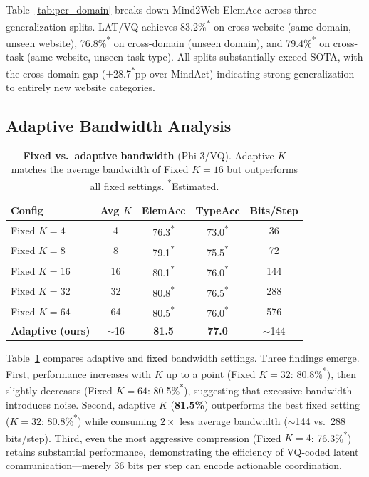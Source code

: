 \documentclass{article}
\newcommand{\best}[1]{\textbf{#1}}
\newcommand{\tbd}[1]{#1\textsuperscript{*}}
\newcommand{\ours}{\textsc{LAT}}
\begin{document}
Table~\ref{tab:per_domain} breaks down Mind2Web ElemAcc across three generalization splits.  \ours{}/VQ achieves \tbd{83.2\%} on cross-website (same domain, unseen website), \tbd{76.8\%} on cross-domain (unseen domain), and \tbd{79.4\%} on cross-task (same website, unseen task type).  All splits substantially exceed SOTA, with the cross-domain gap ($+$\tbd{28.7}pp over MindAct) indicating strong generalization to entirely new website categories.

\subsection{Adaptive Bandwidth Analysis}

\begin{table}[t]
\centering
\caption{\textbf{Fixed vs.\ adaptive bandwidth} (Phi-3/VQ).  Adaptive $K$ matches the average bandwidth of Fixed $K{=}16$ but outperforms all fixed settings.  \textsuperscript{*}Estimated.}
\label{tab:adaptive_k}
\small
\begin{tabular}{lcccc}
\toprule
\textbf{Config} & \textbf{Avg $K$} & \textbf{ElemAcc} & \textbf{TypeAcc} & \textbf{Bits/Step} \\
\midrule
Fixed $K{=}4$ & 4 & \tbd{76.3} & \tbd{73.0} & 36 \\
Fixed $K{=}8$ & 8 & \tbd{79.1} & \tbd{75.5} & 72 \\
Fixed $K{=}16$ & 16 & \tbd{80.1} & \tbd{76.0} & 144 \\
Fixed $K{=}32$ & 32 & \tbd{80.8} & \tbd{76.5} & 288 \\
Fixed $K{=}64$ & 64 & \tbd{80.5} & \tbd{76.0} & 576 \\
\midrule
\textbf{Adaptive (ours)} & ${\sim}$16 & \best{81.5} & \best{77.0} & ${\sim}$144 \\
\bottomrule
\end{tabular}
\end{table}

Table~\ref{tab:adaptive_k} compares adaptive and fixed bandwidth settings.  Three findings emerge.  First, performance increases with $K$ up to a point (Fixed $K{=}32$: \tbd{80.8\%}), then slightly decreases (Fixed $K{=}64$: \tbd{80.5\%}), suggesting that excessive bandwidth introduces noise.  Second, adaptive $K$ (\best{81.5\%}) outperforms the best fixed setting ($K{=}32$: \tbd{80.8\%}) while consuming $2\times$ less average bandwidth (${\sim}$144 vs.\ 288 bits/step).  Third, even the most aggressive compression (Fixed $K{=}4$: \tbd{76.3\%}) retains substantial performance, demonstrating the efficiency of VQ-coded latent communication---merely 36 bits per step can encode actionable coordination.
\end{document}
